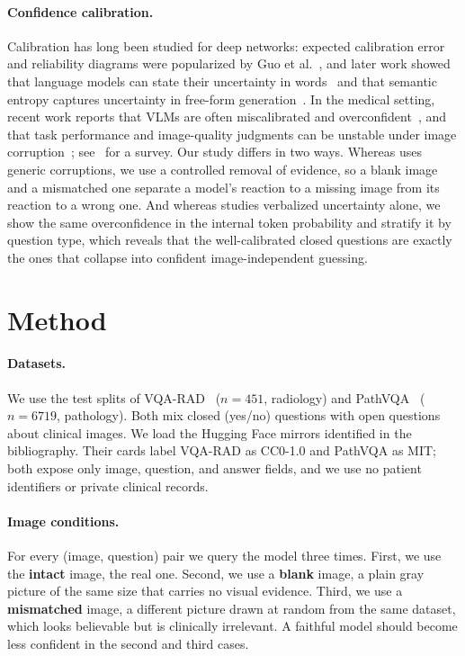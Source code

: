\documentclass{article}
\begin{document}
\paragraph{Confidence calibration.}
Calibration has long been studied for deep networks: expected calibration error and
reliability diagrams were popularized by Guo et al.~\cite{guo_calibration}, and
later work showed that language models can state their uncertainty in
words~\cite{lin_verbalized} and that semantic entropy captures uncertainty in
free-form generation~\cite{kuhn_semantic}. In the medical setting, recent work
reports that VLMs are often miscalibrated and
overconfident~\cite{calib_mllm_miccai, verbalized_uncertainty}, and that task
performance and image-quality judgments can be unstable under image
corruption~\cite{vlm_reliability_corruption,vlm_robustness_artifacts};
see~\cite{vlm_in_medicine_survey} for a survey. Our study
differs in two ways. Whereas \cite{vlm_reliability_corruption} uses generic
corruptions, we use a controlled removal of evidence, so a blank image and a
mismatched one separate a model's reaction to a missing image from its reaction to a
wrong one. And whereas \cite{verbalized_uncertainty} studies verbalized uncertainty
alone, we show the same overconfidence in the internal token probability and stratify
it by question type, which reveals that the well-calibrated closed questions are
exactly the ones that collapse into confident image-independent guessing.

\section{Method}
\paragraph{Datasets.} We use the test splits of VQA-RAD~\cite{vqarad}
($n{=}451$, radiology) and PathVQA~\cite{pathvqa} ($n{=}6719$, pathology). Both
mix closed (yes/no) questions with open questions about clinical images. We load
the Hugging Face mirrors identified in the bibliography. Their cards label
VQA-RAD as CC0-1.0 and PathVQA as MIT; both expose only image, question, and answer
fields, and we use no patient identifiers or private clinical records.

\paragraph{Image conditions.} For every (image, question) pair we query the model
three times. First, we use the \textbf{intact} image, the real one. Second, we use
a \textbf{blank} image, a plain gray picture of the same size that carries no
visual evidence. Third, we use a \textbf{mismatched} image, a different picture
drawn at random from the same dataset, which looks believable but is clinically
irrelevant. A faithful model should become less confident in the second and third
cases.
\end{document}
